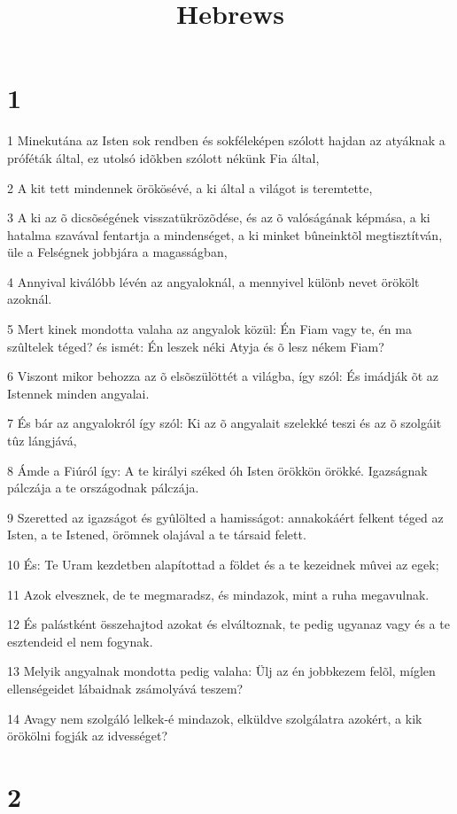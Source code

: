 

\title{Hebrews}


\chapter{1}

\par 1 Minekutána az Isten sok rendben és sokféleképen szólott hajdan az atyáknak a próféták által, ez utolsó idõkben szólott nékünk Fia által,
\par 2 A kit tett mindennek örökösévé, a ki által a világot is teremtette,
\par 3 A ki az õ dicsõségének visszatükrözõdése, és az õ valóságának képmása, a ki hatalma szavával fentartja a mindenséget, a ki minket bûneinktõl megtisztítván,  üle a Felségnek jobbjára a magasságban,
\par 4 Annyival kiválóbb lévén az angyaloknál, a mennyivel különb nevet örökölt azoknál.
\par 5 Mert kinek mondotta valaha az angyalok közül: Én Fiam vagy te, én ma szûltelek téged? és ismét: Én leszek  néki Atyja és õ lesz nékem Fiam?
\par 6 Viszont mikor behozza az õ elsõszülöttét a világba, így szól: És imádják õt az Istennek minden angyalai.
\par 7 És bár az angyalokról így szól: Ki az õ angyalait szelekké teszi és az õ szolgáit tûz lángjává,
\par 8 Ámde a Fiúról így: A te királyi széked óh Isten örökkön örökké. Igazságnak pálczája a te országodnak pálczája.
\par 9 Szeretted az igazságot és gyûlölted a hamisságot: annakokáért felkent téged az Isten, a te Istened, örömnek olajával a te társaid felett.
\par 10 És: Te Uram kezdetben alapítottad a földet és a te kezeidnek mûvei az egek;
\par 11 Azok elvesznek, de te megmaradsz, és mindazok, mint a ruha megavulnak.
\par 12 És palástként összehajtod azokat és elváltoznak, te pedig ugyanaz vagy és a te esztendeid el nem fogynak.
\par 13 Melyik angyalnak mondotta pedig valaha: Ülj az én jobbkezem felõl, míglen ellenségeidet lábaidnak zsámolyává teszem?
\par 14 Avagy nem szolgáló lelkek-é mindazok, elküldve szolgálatra azokért, a kik örökölni fogják az idvességet?

\chapter{2}

